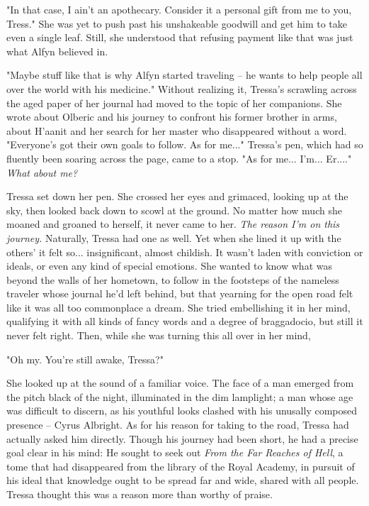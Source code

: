 "In that case, I ain't an apothecary. Consider it a personal gift from me to you, Tress." She was yet to push past his unshakeable goodwill and get him to take even a single leaf. Still, she understood that refusing payment like that was just what Alfyn believed in. 

"Maybe stuff like that is why Alfyn started traveling -- he wants to help people all over the world with his medicine." Without realizing it, Tressa's scrawling across the aged paper of her journal had moved to the topic of her companions. She wrote about Olberic and his journey to confront his former brother in arms, about H'aanit and her search for her master who disappeared without a word. "Everyone's got their own goals to follow. As for me..." Tressa's pen, which had so fluently been soaring across the page, came to a stop. "As for me... I'm... Er...." \emph{What about me?}

Tressa set down her pen. She crossed her eyes and grimaced, looking up at the sky, then looked back down to scowl at the ground. No matter how much she moaned and groaned to herself, it never came to her. \emph{The reason I'm on this journey.} Naturally, Tressa had one as well. Yet when she lined it up with the others' it felt so... insignificant, almost childish. It wasn't laden with conviction or ideals, or even any kind of special emotions. She wanted to know what was beyond the walls of her hometown, to follow in the footsteps of the nameless traveler whose journal he'd left behind, but that yearning for the open road felt like it was all too commonplace a dream. She tried embellishing it in her mind, qualifying it with all kinds of fancy words and a degree of braggadocio, but still it never felt right. Then, while she was turning this all over in her mind,

"Oh my. You're still awake, Tressa?" 

She looked up at the sound of a familiar voice. The face of a man emerged from the pitch black of the night, illuminated in the dim lamplight; a man whose age was difficult to discern, as his youthful looks clashed with his unusally composed presence -- Cyrus Albright. As for his reason for taking to the road, Tressa had actually asked him directly. Though his journey had been short, he had a precise goal clear in his mind: He sought to seek out \emph{From the Far Reaches of Hell}, a tome that had disappeared from the library of the Royal Academy, in pursuit of his ideal that knowledge ought to be spread far and wide, shared with all people. Tressa thought this was a reason more than worthy of praise.

